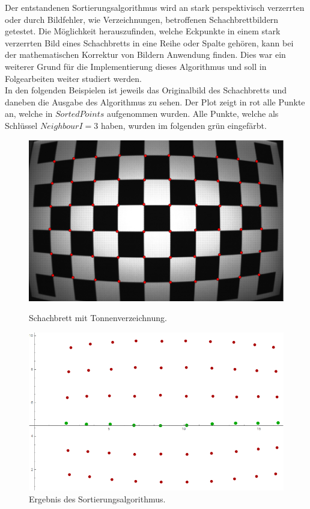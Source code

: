 Der entstandenen Sortierungsalgorithmus wird an stark perspektivisch verzerrten oder durch Bildfehler, wie Verzeichnungen, betroffenen Schachbrettbildern getestet. Die Möglichkeit herauszufinden, welche Eckpunkte in einem stark verzerrten Bild eines Schachbretts in eine Reihe oder Spalte gehören, kann bei der mathematischen Korrektur von Bildern Anwendung finden. Dies war ein weiterer Grund für die Implementierung dieses Algorithmus und soll in Folgearbeiten weiter studiert werden. \\


In den folgenden Beispielen ist jeweils das Originalbild des Schachbretts und daneben die Ausgabe des Algorithmus zu sehen. Der Plot zeigt in rot alle Punkte an, welche in $SortedPoints$ aufgenommen wurden. Alle Punkte, welche als Schlüssel $NeighbourI = 3$ haben, wurden im folgenden grün eingefärbt.


\begin{figure}[!htb]
	\includegraphics[width=\linewidth]{images/Tonnenverzeichnung.png}
	\caption[Schachbrett mit Tonnenverzeichnung]{Schachbrett mit Tonnenverzeichnung.}
	\label{fig:Extreme1}
	\endminipage\hfill
	\includegraphics[width=\linewidth]{images/AlgTonnenverzeichnung.png}
	\caption[Sortierte Punkte eines Schachbretts mit Tonnenverzeichnung]{Ergebnis des Sortierungsalgorithmus.}
	\label{fig:Extreme2}
	\endminipage\hfill
\end{figure}

